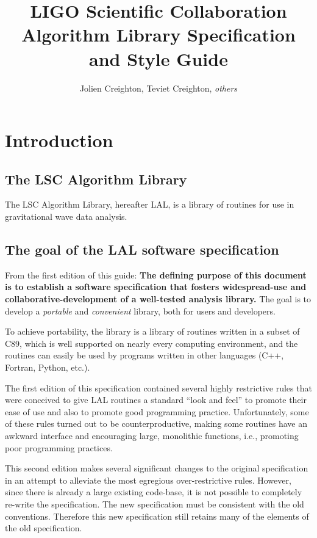 \documentclass[10pt]{ligodcc}
\title{LIGO Scientific Collaboration Algorithm Library Specification and Style
Guide}
\author{Jolien Creighton, Teviet Creighton, \emph{others}}
\begin{document}
\maketitle


\tableofcontents


\section{Introduction}
\label{s:intro}


\subsection{The LSC Algorithm Library}

The LSC Algorithm Library, hereafter LAL, is a library of routines for use in
gravitational wave data analysis.


\subsection{The goal of the LAL software specification}

From the first edition of this guide: \textbf{The defining purpose of this
document is to establish a software specification that fosters widespread-use
and collaborative-development of a well-tested analysis library.}  The goal is
to develop a \emph{portable} and \emph{convenient} library, both for users and
developers.

To achieve portability, the library is a library of routines written in a
subset of C89, which is well supported on nearly every computing environment,
and the routines can easily be used by programs written in other languages
(C++, Fortran, Python, etc.).  

The first edition of this specification contained several highly restrictive
rules that were conceived to give LAL routines a standard ``look and feel''
to promote their ease of use and also to promote good programming practice.
Unfortunately, some of these rules turned out to be counterproductive, making
some routines have an awkward interface and encouraging large, monolithic
functions, i.e., promoting poor programming practices.

This second edition makes several significant changes to the original
specification in an attempt to alleviate the most egregious over-restrictive
rules.  However, since there is already a large existing code-base, it is
not possible to completely re-write the specification.  The new specification
must be consistent with the old conventions.  Therefore this new specification
still retains many of the elements of the old specification.
\end{document}
